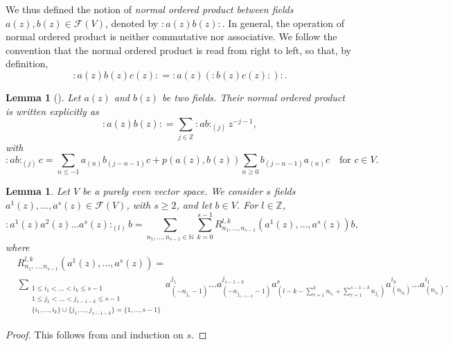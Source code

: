 \documentclass[a4paper, 12pt, reqno]{amsart}
\newtheorem{lemma}[theorem]{Lemma}
\theoremstyle{remark}
\begin{document}
We thus defined the notion of \emph{normal ordered product between fields $a(z), b(z) \in \mathcal{F}(V)$}, denoted by $:a(z)b(z):$.
In general, the operation of normal ordered product is neither commutative nor associative.
We follow the convention that the normal ordered product is read from right to left, so that, by definition,
\begin{equation*}
  :a(z)b(z)c(z): = :a(z)(:b(z)c(z):):.
\end{equation*}

\begin{lemma}[{\cite[Proposition 3.3.3]{nozaradan_introduction_2008}}]
  \label{lmm:2}
  Let $a(z)$ and $b(z)$ be two fields.
  Their normal ordered product is written explicitly as
  \begin{equation*}
    :a(z)b(z): = \sum_{j \in \mathbb{Z}}:ab:_{(j)}z^{-j - 1},
  \end{equation*}
  with
  \begin{equation*}
    :ab:_{(j)}c = \sum_{n \le -1}a_{(n)}b_{(j - n - 1)}c + p(a(z), b(z))\sum_{n \ge 0}b_{(j - n - 1)}a_{(n)}c \quad \text{for $c \in V$}.
  \end{equation*}
\end{lemma}

\begin{lemma}
  \label{lmm:3}
  Let $V$ be a purely even vector space.
  We consider $s$ fields $a^1(z), \dots, a^s(z) \in \mathcal{F}(V)$, with $s \ge 2$, and let $b \in V$.
  For $l \in \mathbb{Z}$,
  \begin{equation*}
    :a^1(z)a^2(z)\dots a^s(z):_{(l)}b = \sum_{n_1, \dots, n_{s - 1} \in \mathbb{N}}\sum_{k = 0}^{s - 1}R^{l, k}_{n_1, \dots, n_{s - 1}}(a^1(z), \dots, a^s(z))b,
  \end{equation*}
  where
  \begin{align*}
    &R^{l, k}_{n_1, \dots, n_{s - 1}}(a^1(z), \dots, a^s(z)) = \\
    &\sum_{\substack{1 \le i_1 < \dots < i_k \le s - 1 \\ 1 \le j_1 < \dots < j_{s - 1 - k} \le s - 1 \\ \{i_1, \dots, i_k\} \cup \{j_1, \dots, j_{s - 1 - k}\} = \{1, \dots, s - 1\}}}a^{j_1}_{(-n_{j_1} - 1)}\dots a^{j_{s - 1 - k}}_{(-n_{j_{s - 1 - k}} - 1)}a^s_{(l - k - \sum_{r = 1}^k n_{i_r} + \sum_{r = 1}^{s - 1 - k}n_{j_r})}a^{i_k}_{(n_{i_k})}\dots a^{i_1}_{(n_{i_1})}.
  \end{align*}
\end{lemma}

\begin{proof}
  This follows from  and induction on $s$.
\end{proof}
\end{document}
